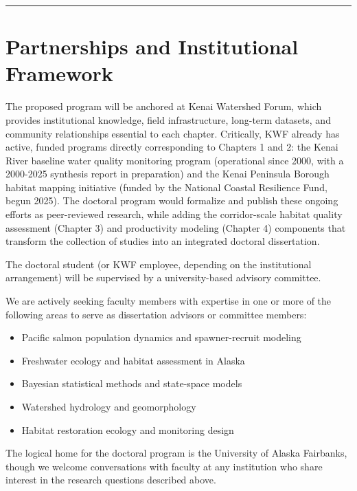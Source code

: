 \documentclass[
  letterpaper,
  DIV=11,
  numbers=noendperiod]{scrreprt}
\providecommand{\tightlist}{%
  \setlength{\itemsep}{0pt}\setlength{\parskip}{0pt}}
\begin{document}
\begin{center}\rule{0.5\linewidth}{0.5pt}\end{center}

\section{Partnerships and Institutional
Framework}\label{partnerships-and-institutional-framework}

The proposed program will be anchored at Kenai Watershed Forum, which
provides institutional knowledge, field infrastructure, long-term
datasets, and community relationships essential to each chapter.
Critically, KWF already has active, funded programs directly
corresponding to Chapters 1 and 2: the Kenai River baseline water
quality monitoring program (operational since 2000, with a 2000-2025
synthesis report in preparation) and the Kenai Peninsula Borough habitat
mapping initiative (funded by the National Coastal Resilience Fund,
begun 2025). The doctoral program would formalize and publish these
ongoing efforts as peer-reviewed research, while adding the
corridor-scale habitat quality assessment (Chapter 3) and productivity
modeling (Chapter 4) components that transform the collection of studies
into an integrated doctoral dissertation.

The doctoral student (or KWF employee, depending on the institutional
arrangement) will be supervised by a university-based advisory
committee.

We are actively seeking faculty members with expertise in one or more of
the following areas to serve as dissertation advisors or committee
members:

\begin{itemize}
\tightlist
\item
  Pacific salmon population dynamics and spawner-recruit modeling
\item
  Freshwater ecology and habitat assessment in Alaska
\item
  Bayesian statistical methods and state-space models
\item
  Watershed hydrology and geomorphology
\item
  Habitat restoration ecology and monitoring design
\end{itemize}

The logical home for the doctoral program is the University of Alaska
Fairbanks, though we welcome conversations with faculty at any
institution who share interest in the research questions described
above.
\end{document}
